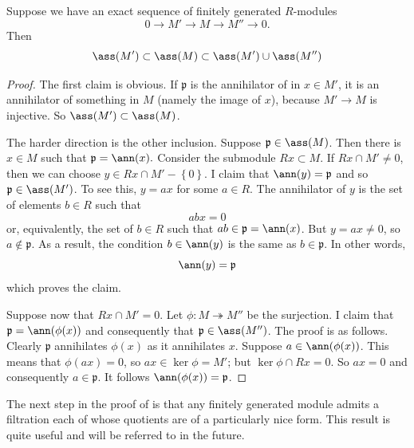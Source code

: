 \begin{lemma} \label{assexact} 
Suppose we have an exact sequence of finitely generated $R$-modules
\[ 0 \to M' \to M \to M'' \to 0.  \]
Then 
\[\ass(M') \subset \ass(M) \subset \ass(M') \cup \ass(M'')  \]
\end{lemma} 
\begin{proof} 
The first claim is obvious. If $\mathfrak{p}$ is the annihilator of
in $x \in M'$, it is an annihilator of something in $M$ (namely the image of
$x$), because
$M' \to M$ is injective. So $\ass(M') \subset \ass(M)$. 

The harder direction is the other inclusion. Suppose $\mathfrak{p} \in \ass(M)$.
Then there is $x \in M$ such that
$\mathfrak{p} = \ann(x).$
Consider the submodule $Rx \subset M$.  If $Rx \cap M' \neq 0$, then we can
choose $y \in Rx \cap M' - \left\{0\right\}$. I claim that $\ann(y) =
\mathfrak{p}$ and so $\mathfrak{p} \in \ass(M')$.
To see this, $ y = ax$ for some $a \in R$. The annihilator of $y$ is the set of elements
$b \in R$ such that
\[ abx = 0  \]
or, equivalently, the set of $b \in R$ such that $ab \in \mathfrak{p} =
\ann(x)$. But $y = ax \neq 0$, so $a \notin \mathfrak{p}$. As a
result, the condition $b \in \ann(y)$ is the same as $b \in \mathfrak{p}$. In
other words, 
\[ \ann(y) = \mathfrak{p}  \]
which proves the claim.

Suppose now that  $Rx \cap M' = 0$. Let $\phi: M \twoheadrightarrow M''$
be the surjection. I claim that $\mathfrak{p} = \ann(\phi(x))$ and
consequently that
$\mathfrak{p} \in \ass(M'')$.  The proof is as follows. Clearly $\mathfrak{p}$
annihilates $\phi(x)$ as it annihilates $x$. Suppose $a \in \ann(\phi(x))$.
This means that $\phi(ax) = 0$, so $ax \in \ker \phi=M'$; but $\ker \phi \cap Rx =
0$. So $ax = 0$ and consequently $a \in \mathfrak{p}$. It follows $\ann(\phi(x)) = \mathfrak{p}$. 
\end{proof} 

The next step in the proof of  is that any
finitely generated module
admits a filtration each of whose quotients are of a particularly nice form.
This result is quite useful and will be referred to in the future.

